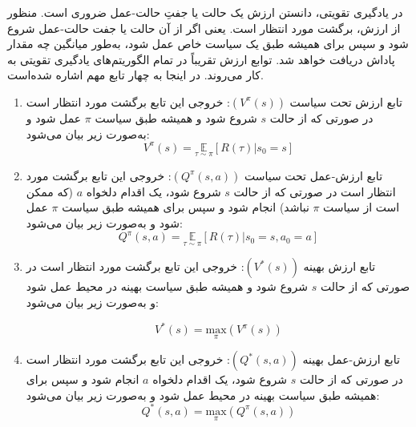    در یادگیری تقویتی، دانستن ارزش
    یک حالت یا جفتِ حالت-عمل ضروری است. منظور از ارزش، برگشت مورد انتظار
     است. یعنی اگر از آن حالت یا جفت حالت-عمل شروع شود و سپس برای همیشه طبق یک سیاست خاص عمل شود، به‌‌طور میانگین چه مقدار پاداش دریافت خواهد شد. توابع ارزش تقریباً در تمام الگوریتم‌های یادگیری تقویتی به کار می‌روند.
   در اینجا به چهار تابع مهم اشاره شده‌است.
   \begin{enumerate}
   	
   	\item تابع ارزش تحت سیاست 
   	  $(V^{\pi}(s))$:
   	  خروجی این تابع برگشت مورد انتظار است در صورتی که از حالت $s$ شروع شود و همیشه طبق سیاست $\pi$ عمل شود و به‌صورت زیر بیان می‌شود:
   	   \begin{equation}
   	   	V^{\pi}(s) = \underset{\tau \sim \pi}{\mathbb{E}}\left[R(\tau)|s_0 = s\right]
   	   \end{equation}
   	   
   	\item تابع ارزش-عمل تحت سیاست 
   	$(Q^{\pi}(s, a))$:
   	خروجی این تابع برگشت مورد انتظار است در صورتی که از حالت $s$ شروع شود، یک اقدام دلخواه $a$ (که ممکن است از سیاست $\pi$ نباشد) انجام شود و سپس برای همیشه طبق سیاست $\pi$ عمل شود و به‌صورت زیر بیان می‌شود:
		\begin{equation}
		Q^{\pi}(s, a) = \underset{\tau \sim \pi}{\mathbb{E}}\left[R(\tau)|s_0 = s, a_0 = a\right]
		\end{equation}

 	
   	\item تابع ارزش بهینه
   	  $(V^*(s))$: 
   	 خروجی این تابع برگشت مورد انتظار است در صورتی که از حالت $s$ شروع شود و همیشه طبق سیاست بهینه در محیط عمل شود و به‌صورت زیر بیان می‌شود:

	 \begin{equation}
	 V^*(s) = \underset{\pi}{\mathrm{max}} (V^{\pi}(s))
	 \end{equation}
   	
   	\item تابع ارزش-عمل بهینه
   	  $(Q^*(s, a))$:
   	خروجی این تابع برگشت مورد انتظار است در صورتی که از حالت $s$ شروع شود، یک اقدام دلخواه $a$ انجام شود و سپس برای همیشه طبق سیاست بهینه در محیط عمل شود و به‌صورت زیر بیان می‌شود:
		\begin{equation}
		Q^*(s, a) = \underset{\pi}{\mathrm{max}} (Q^{\pi}(s, a))
		\end{equation}
   	
   \end{enumerate}
   
